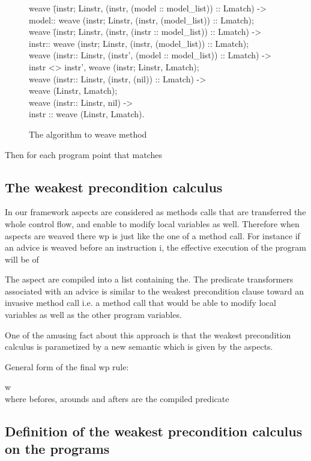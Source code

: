 \documentclass[draft]{llncs}
\begin{document}
%
\begin{figure}
\bcode
weave \=(instr; Linstr, (instr, (model :: model\_list)) :: Lmatch) -> \\
\>model:: weave (instr; Linstr, (instr, (model\_list)) :: Lmatch);\\
weave \=(instr; Linstr, (instr, (instr :: model\_list)) :: Lmatch) -> \\
\>instr:: weave (instr; Linstr, (instr, (model\_list)) :: Lmatch);\\
weave (instr:: Linstr, (instr', (model :: model\_list)) :: Lmatch) -> \\
\>instr <> instr',  weave (instr; Linstr, Lmatch);\\
weave (instr:: Linstr, (instr, (nil)) :: Lmatch) -> \\
\>weave (Linstr, Lmatch);\\
weave (instr:: Linstr, nil) -> \\
\>instr :: weave (Linstr, Lmatch).
\ecode
\caption{The algorithm to weave method}
\label{weaving_algo}
\end{figure}
Then for each program point that matches

\subsection{The weakest precondition calculus}

In our framework aspects are considered as methods calls that are transferred the whole
control flow, and enable to modify local variables as well. Therefore when aspects are weaved
there wp is just like the one of a method call.
For instance if an advice is weaved before an instruction i, the effective execution of the program
will be of

The aspect are compiled into a list containing the.
The predicate transformers associated with an advice is similar to the weakest precondition
clause toward an invasive method call i.e. a method call that would be able to modify local variables
as well as the other program variables.

One of the amusing fact about this approach is that the weakest precondition calculus is parametized by a new 
semantic which is given by the aspects.

General form of the final wp rule:
\bcode

w\\
\ecode
where befores, arounds and afters are the compiled predicate
\subsection{Definition of the weakest precondition calculus on the programs}
\end{document}
